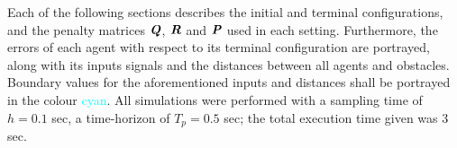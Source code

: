 
Each of the following sections describes the initial and terminal configurations,
and the penalty matrices $\bm{\mathit{Q}}$, $\bm{\mathit{R}}$ and $\bm{\mathit{P}}$ used in each setting.
Furthermore, the errors of each agent with respect to its terminal configuration
are portrayed, along with its inputs signals and the distances between all
agents and obstacles. Boundary values for the aforementioned inputs and
distances shall be portrayed in the colour \textcolor{cyan}{cyan}.
All simulations were performed with a sampling time of $h = 0.1$ sec,
a time-horizon of $T_p = 0.5$ sec; the total execution time given was $3$ sec.
